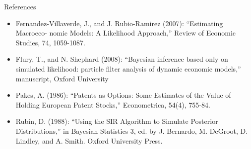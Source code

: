 \begin{frame}{References}
\begin{itemize}
\item Fernandez-Villaverde, J., and J. Rubio-Ramirez (2007): ``Estimating Macroeco- nomic Models: A Likelihood Approach,'' Review of Economic Studies, 74, 1059-1087.\\
\item Flury, T., and N. Shephard (2008): ``Bayesian inference based only on simulated likelihood: particle filter analysis of dynamic economic models,'' manuscript, Oxford University\\
\item Pakes, A. (1986): ``Patents as Options: Some Estimates of the Value of Holding European Patent Stocks,'' Econometrica, 54(4), 755-84.\\
\item Rubin, D. (1988): ``Using the SIR Algorithm to Simulate Posterior Distributions,'' in Bayesian Statistics 3, ed. by J. Bernardo, M. DeGroot, D. Lindley, and A. Smith. Oxford University Press.\\
\end{itemize}
\end{frame}

















































